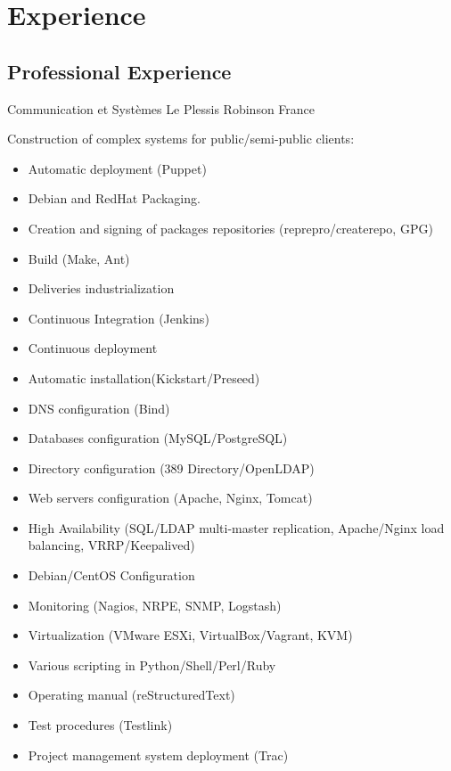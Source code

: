 \documentclass[11pt,a4paper,sans]{moderncv}        %
\begin{document}
\section{Experience}

\subsection{Professional Experience}
              {Communication et Systèmes}
              {Le Plessis Robinson}
              {France}
              {Construction of complex systems for public/semi-public clients:
                \begin{itemize}
                \item Automatic deployment (Puppet)
                \item Debian and RedHat Packaging.
                \item Creation and signing of packages repositories (reprepro/createrepo, GPG)
                \item Build (Make, Ant)
                \item Deliveries industrialization
		\item Continuous Integration (Jenkins)
                \item Continuous deployment
                \item Automatic installation(Kickstart/Preseed)
                \item DNS configuration (Bind)
                \item Databases configuration (MySQL/PostgreSQL)
                \item Directory configuration (389 Directory/OpenLDAP)
                \item Web servers configuration (Apache, Nginx, Tomcat)
                \item High Availability (SQL/LDAP multi-master replication, Apache/Nginx load balancing, VRRP/Keepalived)
                \item Debian/CentOS Configuration
                \item Monitoring (Nagios, NRPE, SNMP, Logstash)
                \item Virtualization (VMware ESXi, VirtualBox/Vagrant, KVM)
                \item Various scripting in Python/Shell/Perl/Ruby
                \item Operating manual (reStructuredText)
                \item Test procedures (Testlink)
                \item Project management system deployment (Trac)
                \end{itemize}
              }
\end{document}
